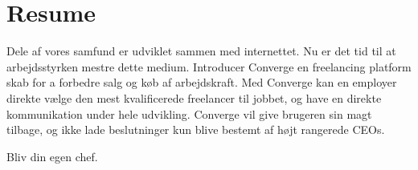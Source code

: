 \chapter{Resume}

Dele af vores samfund er udviklet sammen med internettet. Nu er det tid til at arbejdsstyrken mestre dette medium. Introducer Converge en freelancing platform skab for a forbedre salg og køb af arbejdskraft. Med Converge kan en employer direkte vælge den mest kvalificerede freelancer til jobbet, og have en direkte kommunikation under hele udvikling. Converge vil give brugeren sin magt tilbage, og ikke lade beslutninger kun blive bestemt af højt rangerede CEOs.

Bliv din egen chef.
